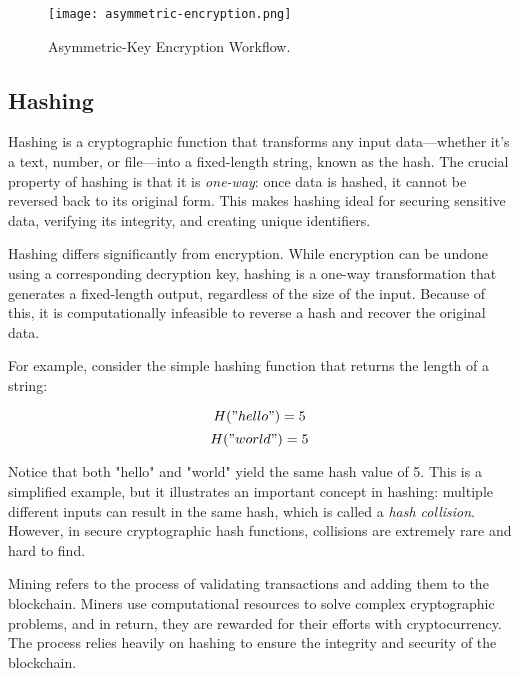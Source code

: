 \documentclass[12pt,a4paper]{report}
\begin{document}
\begin{figure}[ht]
    \centering
    \texttt{[image: asymmetric-encryption.png]}
    \caption{Asymmetric-Key Encryption Workflow.}
    \label{asymmetric-encryption}
\end{figure}





\subsection{Hashing}

\begin{tcolorbox}[colframe=black!75, colback=white, sharp corners, fonttitle=\bfseries, boxrule=0.5pt, title=\faInfoCircle\ Definition 1-9: Hashing]
Hashing is a cryptographic function that transforms any input data—whether it’s a text, number, or file—into a fixed-length string, known as the hash. The crucial property of hashing is that it is \textit{one-way}: once data is hashed, it cannot be reversed back to its original form. This makes hashing ideal for securing sensitive data, verifying its integrity, and creating unique identifiers.
\end{tcolorbox}

Hashing differs significantly from encryption. While encryption can be undone using a corresponding decryption key, hashing is a one-way transformation that generates a fixed-length output, regardless of the size of the input. Because of this, it is computationally infeasible to reverse a hash and recover the original data.

For example, consider the simple hashing function that returns the length of a string:

\[
H("hello") = 5
\]
\[
H("world") = 5
\]

Notice that both "hello" and "world" yield the same hash value of 5. This is a simplified example, but it illustrates an important concept in hashing: multiple different inputs can result in the same hash, which is called a \textit{hash collision}. However, in secure cryptographic hash functions, collisions are extremely rare and hard to find.

\begin{tcolorbox}[colframe=black!75, colback=white, sharp corners, fonttitle=\bfseries, boxrule=0.5pt, title=\faInfoCircle\ Definition 1-10: Mining]
Mining refers to the process of validating transactions and adding them to the blockchain. Miners use computational resources to solve complex cryptographic problems, and in return, they are rewarded for their efforts with cryptocurrency. The process relies heavily on hashing to ensure the integrity and security of the blockchain.
\end{tcolorbox}
\end{document}
